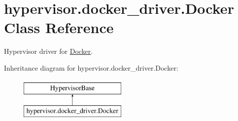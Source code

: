 \hypertarget{classhypervisor_1_1docker__driver_1_1Docker}{\section{hypervisor.\-docker\-\_\-driver.\-Docker Class Reference}
\label{classhypervisor_1_1docker__driver_1_1Docker}
}


Hypervisor driver for \hyperlink{classhypervisor_1_1docker__driver_1_1Docker}{Docker}.  


Inheritance diagram for hypervisor.\-docker\-\_\-driver.\-Docker\-:\begin{figure}[H]
\begin{center}
\leavevmode
\includegraphics[height=2.000000cm]{classhypervisor_1_1docker__driver_1_1Docker}
\end{center}
\end{figure}

